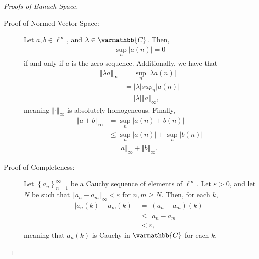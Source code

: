 \documentclass[12pt]{extarticle}
\newcommand{\C}{\mathbb{C}}
\newcommand{\norm}[1]{\left\Vert #1\right\Vert}
\newcommand{\set}[1]{\left\{#1\right\}}
\newcommand{\ve}{\varepsilon}
\theoremstyle{plain}
\theoremstyle{definition}
\theoremstyle{note}
\renewcommand*{\mathbb}[1]{\varmathbb{#1}}
\renewcommand{\newline}{\hfill\break}
\begin{document}
\begin{proof}[Proofs of Banach Space]\hfill
  \begin{description}[font = \normalfont]
    \item[$\ell^{\infty}$:]\hfill
      \begin{description}
        \item[Proof of Normed Vector Space:] Let $a,b\in \ell^{\infty}$, and $\lambda \in \C$. Then,
          \begin{align*}
            \sup_{n}|a(n)| = 0
          \end{align*}
          if and only if $a$ is the zero sequence. Additionally, we have that
          \begin{align*}
            \norm{\lambda a}_{\infty} &= \sup_{n}\left\vert \lambda a(n) \right\vert\\
                             &= |\lambda|sup_{n}|a(n)|\\
                             &= |\lambda|\norm{a}_{\infty},
          \end{align*}
          meaning $\norm{\cdot}_{\infty}$ is absolutely homogeneous. Finally,
          \begin{align*}
            \norm{a + b}_{\infty} &= \sup_{n}\left\vert a(n) + b(n) \right\vert\\
                         &\leq \sup_{n}\left\vert a(n) \right\vert + \sup_{n}\left\vert b(n) \right\vert\\
                         &= \norm{a}_{\infty} + \norm{b}_{\infty}.
          \end{align*}
        \item[Proof of Completeness:] Let $\set{a_n}_{n=1}^{\infty}$ be a Cauchy sequence of elements of $\ell^{\infty}$. Let $\ve > 0$, and let $N$ be such that $\norm{a_n - a_m}_{\infty} < \varepsilon$ for $n,m \geq N$. Then, for each $k$,
          \begin{align*}
            \left\vert a_{n}(k) - a_m(k) \right\vert &= \left\vert (a_n - a_m)(k) \right\vert\\
                                                     &\leq \norm{a_n - a_m}\\
                                                     &< \varepsilon,
          \end{align*}
          meaning that $a_n(k)$ is Cauchy in $\C$ for each $k$.\newline


\end{description}
\end{description}
\end{proof}
\end{document}
